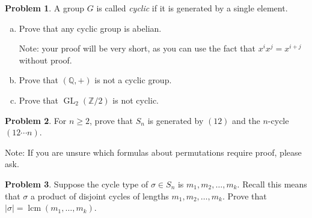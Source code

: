 \documentclass[11pt]{article}
\DeclareMathOperator{\lcm}{lcm}
\theoremstyle{definition}
\newtheorem{problem}{Problem}
\begin{document}
\begin{problem}
	A group $G$ is called {\it cyclic} if it is generated by a single element. 
	
	\begin{enumerate}[(a)]
		\item Prove that any cyclic group is abelian. 
		
		\noindent Note: your proof will be very short, as you can use the fact that $x^ix^j = x^{i+j}$ without proof.

		\item Prove that $(\mathbb Q, +)$ is not a cyclic group.
	\item Prove that $\operatorname{GL}_2(\mathbb Z/2)$ is not cyclic.
	\end{enumerate}
\end{problem}


\begin{problem}
For $n \geqslant 2$, prove that $S_n$ is generated by $(12)$ and the $n$-cycle $(12 \cdots n)$.

\noindent Note: If you are unsure which formulas about permutations require proof, please ask.
\end{problem}



\begin{problem}
Suppose the cycle type of $\sigma \in S_n$ is $m_1, m_2, \ldots, m_k$. Recall this means that $\sigma$ a product of disjoint cycles of lengths $m_1, m_2, \ldots, m_k$. Prove that $|\sigma| = \lcm (m_1, \ldots, m_k)$. 
\end{problem}
\end{document}
